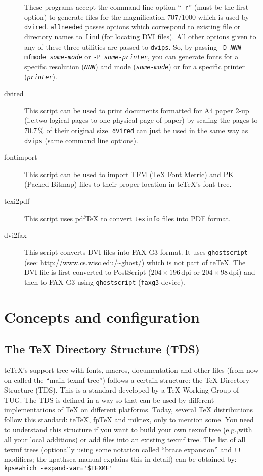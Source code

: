 \documentclass[11pt,a4paper]{article}
\newcommand{\teTeX}{\textrm{te}\TeX\xspace}
\begin{document}
\begin{description}
  These programs accept the command line option ``\texttt{-r}'' (must
  be the first option) to generate files for the magnification $707 /
  1000$ which is used by \texttt{dvired}. \texttt{allneeded} passes
  options which correspond to existing file or directory names to
  \texttt{find} (for locating DVI files). All other options given to
  any of these three utilities are passed to \texttt{dvips}. So, by
  passing \texttt{-D \textit{NNN} -mfmode \textit{some-mode}} or
  \texttt{-P \textit{some-printer}}, you can generate fonts for a
  specific resolution (\texttt{\textit{NNN}}) and mode
  (\texttt{\textit{some-mode}}) or for a specific printer
  (\texttt{\textit{printer}}).
\item[dvired] This script can be used to print documents formatted for
  A4 paper 2-up (i.e.\@ two logical pages to one physical page of
  paper) by scaling the pages to 70.7\,\% of their original size.
  \texttt{dvired} can just be used in the same way as \texttt{dvips}
  (same command line options).
\item[fontimport] This script can be used to import TFM (\TeX{} Font
  Metric) and PK (Packed Bitmap) files to their proper location in
  \teTeX's font tree.
\item[texi2pdf] This script uses pdf\TeX{} to convert \texttt{texinfo}
  files into PDF format.
\item[dvi2fax] This script converts DVI files into FAX G3 format. It
  uses \texttt{ghostscript} (see:
  \url{http://www.cs.wisc.edu/~ghost/}) which is not part of \teTeX{}.
  The DVI file is first converted to PostScript ($204\times 196$\,dpi
  or $204\times 98$\,dpi) and then to FAX G3 using
  \texttt{ghostscript} (\texttt{faxg3} device).
\end{description}


\section{Concepts and configuration}

\subsection{The \TeX{} Directory Structure (TDS)}
\teTeX{}'s support tree with fonts, macros, documentation and other
files (from now on called the ``main texmf tree'') follows a certain
structure: the \TeX{} Directory Structure (TDS). This is a standard
developed by a \TeX{} Working Group of TUG. The TDS is defined in a
way so that can be used by different implementations of \TeX{} on
different platforms.  Today, several \TeX{} distributions follow this
standard: \teTeX, fp\TeX{} and miktex, only to mention some.  You need
to understand this structure if you want to build your own texmf tree
(e.g.,\@ with all your local additions) or add files into an existing
texmf tree.  The list of all texmf trees (optionally using some
notation called ``brace expansion'' and \verb+!!+ modifiers; the
kpathsea manual
explains this in detail) can be obtained by:\\
\null\qquad\verb+kpsewhich -expand-var='$TEXMF'+
\end{document}

